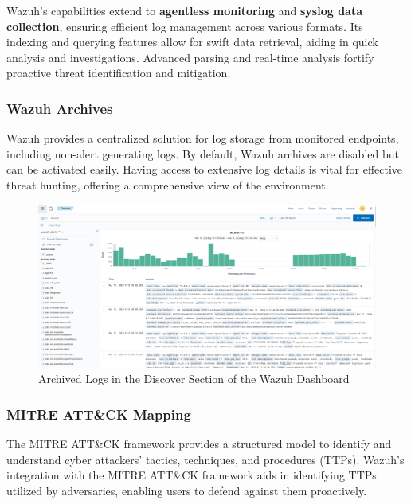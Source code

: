 Wazuh's capabilities extend to \textbf{agentless monitoring} and \textbf{syslog data collection}, ensuring efficient log management across various formats. Its indexing and querying features allow for swift data retrieval, aiding in quick analysis and investigations. Advanced parsing and real-time analysis fortify proactive threat identification and mitigation.

\subsubsection{Wazuh Archives}

Wazuh provides a centralized solution for log storage from monitored endpoints, including non-alert generating logs. By default, Wazuh archives are disabled but can be activated easily. Having access to extensive log details is vital for effective threat hunting, offering a comprehensive view of the environment.

\begin{figure}[H]
    \centering
    \includegraphics[width=\textwidth]{images/threat-hunting/discover-archives-logs.png}
    \caption{Archived Logs in the Discover Section of the Wazuh Dashboard}
    \label{fig:discover-archives-logs}
\end{figure}

\subsubsection{MITRE ATT\&CK Mapping}

The MITRE ATT\&CK framework provides a structured model to identify and understand cyber attackers' tactics, techniques, and procedures (TTPs). Wazuh's integration with the MITRE ATT\&CK framework aids in identifying TTPs utilized by adversaries, enabling users to defend against them proactively.

